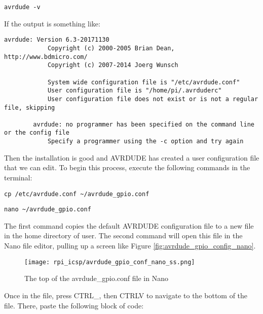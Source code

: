     \begin{lstlisting}[style=kaolstplain,linewidth=1.5\textwidth]
        avrdude -v
    \end{lstlisting}

    If the output is something like:

    \begin{lstlisting}[style=kaolstplain,linewidth=1.5\textwidth]
        avrdude: Version 6.3-20171130
            Copyright (c) 2000-2005 Brian Dean, http://www.bdmicro.com/
            Copyright (c) 2007-2014 Joerg Wunsch

            System wide configuration file is "/etc/avrdude.conf"
            User configuration file is "/home/pi/.avrduderc"
            User configuration file does not exist or is not a regular file, skipping

        avrdude: no programmer has been specified on the command line or the config file
            Specify a programmer using the -c option and try again
    \end{lstlisting}

    Then the installation is good and AVRDUDE has created a user configuration file that we can edit. To begin this process, execute the following commands in the terminal:

    \begin{lstlisting}[style=kaolstplain,linewidth=1.5\textwidth]
        cp /etc/avrdude.conf ~/avrdude_gpio.conf
    \end{lstlisting}

    \begin{lstlisting}[style=kaolstplain,linewidth=1.5\textwidth]
        nano ~/avrdude_gpio.conf
    \end{lstlisting}

    The first command copies the default AVRDUDE configuration file to a new file in the home directory of user. 
    The second command will open this file in the Nano file editor, pulling up a screen like Figure \ref{fig:avrdude_gpio_config_nano}.
    
    \begin{figure}[h!]
        \texttt{[image: rpi\_icsp/avrdude\_gpio\_conf\_nano\_ss.png]}
        \caption[AVRDUDE GPIO config file open in Nano]{The top of the avrdude\_gpio.conf file in Nano}
    \end{figure}

    Once in the file, press CTRL\+\_, then CTRL\+V to navigate to the bottom of the file. There, paste the following block of code:

